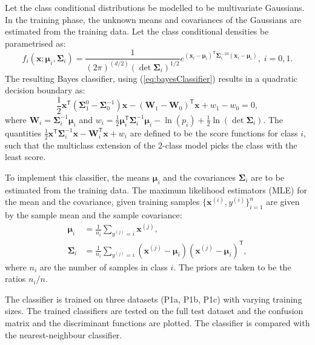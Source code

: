 \documentclass[11pt, a4 paper]{article}
\newcommand{\bx}{\mathbf{x}}
\newcommand{\bW}{\mathbf{W}}
\newcommand{\TT}{\mathsf{T}}
\newcommand{\bmu}{\boldsymbol{\mu}}
\newcommand{\bSigma}{\boldsymbol{\Sigma}}
\begin{document}
\label{prob:1.1}
Let the class conditional distributions be modelled to be multivariate Gaussians. In the training phase, the unknown means and covariances of the Gaussians are estimated from the training data. Let the class conditional densities be parametrised as:
\begin{equation}
	f_i(\bx; \bmu_i, \bSigma_i) = \frac{1}{(2\pi)^{(d/2)}(\det \bSigma_i)^{1/2}} e^{(\bx_i - \bmu_i)^\TT \bSigma_i^{-10} (\bx_i - \bmu_i)}, \; i=0,1.
\end{equation}
The resulting Bayes classifier, using (\ref{eq:bayesClassifier}) results in a quadratic decision boundary as:
\begin{equation}
	\frac{1}{2}\bx^\TT\left( \bSigma_1^{0} - \bSigma_{0}^{-1} \right)\bx - (\bW_{1} - \bW_{0})^{\TT}\bx + w_{1}-w_{0} = 0,
\label{eq:QDA}
\end{equation}
where $\bW_{i} = \bSigma_i^{-1}\bmu_i$ and $\displaystyle w_{i} = \frac{1}{2} \bmu_i^\TT \bSigma_i^{-1} \bmu_i - \ln \left( p_{i} \right) + \frac{1}{2}\ln \left( \det \bSigma_i \right)$. The quantities $\frac{1}{2}\bx^\TT \bSigma_i^{-1} \bx - \bW_{i}^{\TT}\bx + w_{i}$ are defined to be the score functions for class $i$, such that the multiclass extension of the $2$-class model picks the class with the least score.

To implement this classifier, the means $\bmu_{i}$ and the covariances $\bSigma_{i}$ are to be estimated from the training data. The maximum likelihood estimators (MLE) for the mean and the covariance, given training samples $\{\bx^{(i)}, y^{(i)}\}_{i=1}^n$ are given by the sample mean and the sample covariance:
\begin{equation}
\begin{split}
	\bmu_{i} &= \frac{1}{n_{i}} \sum_{y^{(j)} = i} \bx^{(j)}, \\
	\bSigma_{i} &= \frac{1}{n_{i}} \sum_{y^{(j)}=i} (\bx^{(j)} - \bmu_{i}) (\bx^{(j)} - \bmu_{i})^{\TT},
\end{split}
\end{equation}
where $n_{i}$ are the number of samples in class $i$. The priors are taken to be the ratios $n_{i}/n$.

The classifier is trained on three datasets (P1a, P1b, P1c) with varying training sizes. The trained classifiers are tested on the full test dataset and the confusion matrix and the discriminant functions are plotted. The classifier is compared with the nearest-neighbour classifier.
\end{document}
